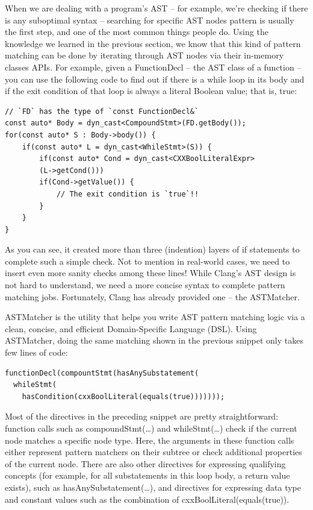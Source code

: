 
When we are dealing with a program's AST – for example, we're checking if there is any suboptimal syntax – searching for specific AST nodes pattern is usually the first step, and one of the most common things people do. Using the knowledge we learned in the previous section, we know that this kind of pattern matching can be done by iterating through AST nodes via their in-memory classes APIs. For example, given a FunctionDecl – the AST class of a function – you can use the following code to find out if there is a while loop in its body and if the exit condition of that loop is always a literal Boolean value; that is, true:

\begin{lstlisting}[style=styleCXX]
// `FD` has the type of `const FunctionDecl&`
const auto* Body = dyn_cast<CompoundStmt>(FD.getBody());
for(const auto* S : Body->body()) {
	if(const auto* L = dyn_cast<WhileStmt>(S)) {
		if(const auto* Cond = dyn_cast<CXXBoolLiteralExpr>
		(L->getCond()))
		if(Cond->getValue()) {
			// The exit condition is `true`!!
		}
	}
}
\end{lstlisting}

As you can see, it created more than three (indention) layers of if statements to complete such a simple check. Not to mention in real-world cases, we need to insert even more sanity checks among these lines! While Clang's AST design is not hard to understand, we need a more concise syntax to complete pattern matching jobs. Fortunately, Clang has already provided one – the ASTMatcher.

ASTMatcher is the utility that helps you write AST pattern matching logic via a clean, concise, and efficient Domain-Specific Language (DSL). Using ASTMatcher, doing the same matching shown in the previous snippet only takes few lines of code:

\begin{lstlisting}[style=styleCXX]
functionDecl(compountStmt(hasAnySubstatement(
  whileStmt(
    hasCondition(cxxBoolLiteral(equals(true)))))));
\end{lstlisting}

Most of the directives in the preceding snippet are pretty straightforward: function calls such as compoundStmt(…) and whileStmt(…) check if the current node matches a specific node type. Here, the arguments in these function calls either represent pattern matchers on their subtree or check additional properties of the current node. There are also other directives for expressing qualifying concepts (for example, for all substatements in this loop body, a return value exists), such as hasAnySubstatement(…), and directives for expressing data type and constant values such as the combination of cxxBoolLiteral(equals(true)).

